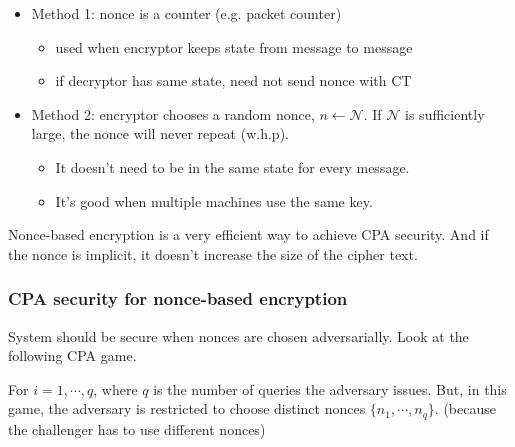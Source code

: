 \documentclass[12pt]{book}
\begin{document}
\begin{itemize}
	\item Method 1: nonce is a counter (e.g. packet counter)
	\begin{itemize}
		\item used when encryptor keeps state from message to message
		\item if decryptor has same state, need not send nonce with CT
	\end{itemize}
	\item Method 2: encryptor chooses a random nonce, $n\leftarrow\mathcal{N}$. If $\mathcal{N}$ is sufficiently large, the nonce will never repeat (w.h.p).
	\begin{itemize}
		\item It doesn't need to be in the same state for every message.
		\item It's good when multiple machines use the same key.
	\end{itemize}
\end{itemize}

Nonce-based encryption is a very efficient way to achieve CPA security. And if the nonce is implicit, it doesn't increase the size of the cipher text.

\subsubsection{CPA security for nonce-based encryption}
System should be secure when nonces are chosen adversarially. Look at the following CPA game.
\begin{center}
\end{center}For $i=1,\cdots,q$, where $q$ is the number of queries the adversary issues. But, in this game, the adversary is restricted to choose distinct nonces $\{n_{1},\cdots,n_{q}\}$. (because the challenger has to use different nonces)
\end{document}
